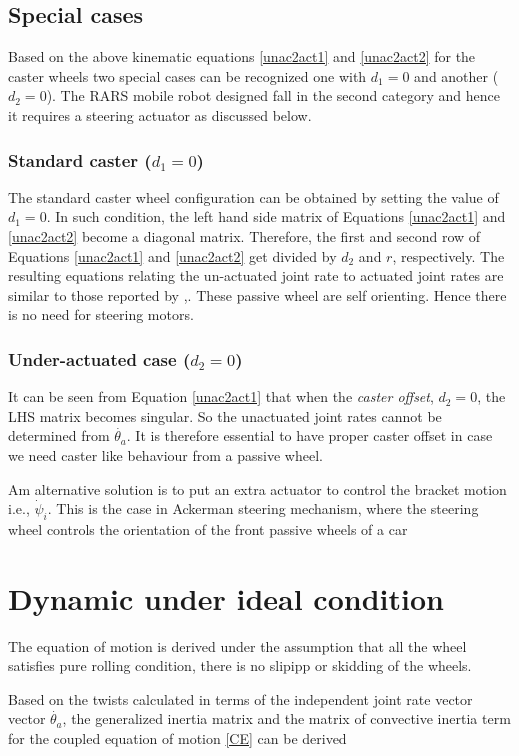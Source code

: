 \subsection{Special cases}
Based on the above kinematic equations \ref{unac2act1} and \ref{unac2act2} for the caster wheels two special cases can be recognized one with $d_1=0$ and another ($d_2=0$). The RARS mobile robot designed fall in the second category and hence it requires a steering actuator as discussed below.  
\subsubsection{Standard caster ($d_1=0$) }
The  standard caster wheel configuration can be obtained by setting the value of $d_1=0$. In such condition, the left hand side matrix of  Equations \ref{unac2act1} and \ref{unac2act2} become  a diagonal matrix. Therefore, the first and second row of Equations \ref{unac2act1} and \ref{unac2act2} get divided by $d_2$ and $r$, respectively. The resulting  equations relating the un-actuated joint rate to  actuated joint rates are similar to those reported by \cite{saha1991dynamics},\cite{angeles2013fundamentals}. These passive wheel are self orienting. Hence there is no need for steering motors. 
\subsubsection{Under-actuated case ($d_2=0$)}
It can be seen from Equation \ref{unac2act1} that when the \textit{caster offset}, $d_2=0$, the LHS matrix becomes singular. So the unactuated joint rates cannot be determined from $\dot{\theta_a}$. It is therefore essential to have proper caster offset in case we need caster like behaviour from a passive wheel. 

Am alternative solution is to put an extra actuator to control the bracket motion i.e., $\dot\psi_i$. This is the case in Ackerman steering mechanism, where the steering wheel controls the orientation of the front passive wheels of a car
\section{Dynamic under ideal condition}
The equation of motion is derived under the assumption that all the wheel satisfies pure rolling condition, there is no slipipp or skidding of the wheels.


Based on the twists calculated in terms of the independent joint rate vector vector $\dot{\theta_a}$,  the generalized inertia matrix and the matrix of convective inertia term for the coupled equation of motion \ref{CE} can be derived 
